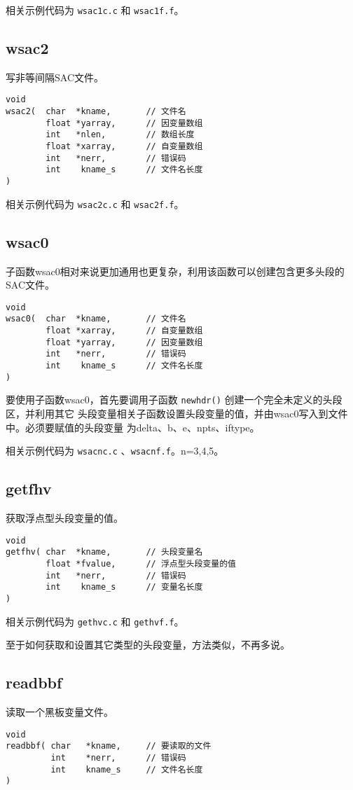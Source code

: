 相关示例代码为 \texttt{wsac1c.c} 和 \texttt{wsac1f.f}。

\subsection{wsac2}
写非等间隔SAC文件。

\begin{verbatim}
void
wsac2(  char  *kname,       // 文件名
        float *yarray,      // 因变量数组
        int   *nlen,        // 数组长度
        float *xarray,      // 自变量数组
        int   *nerr,        // 错误码
        int    kname_s      // 文件名长度
)
\end{verbatim}

相关示例代码为 \texttt{wsac2c.c} 和 \texttt{wsac2f.f}。

\subsection{wsac0}
子函数wsac0相对来说更加通用也更复杂，利用该函数可以创建包含更多头段的SAC文件。

\begin{verbatim}
void
wsac0(  char  *kname,       // 文件名
        float *xarray,      // 自变量数组
        float *yarray,      // 因变量数组
        int   *nerr,        // 错误码
        int    kname_s      // 文件名长度
)
\end{verbatim}

要使用子函数wsac0，首先要调用子函数 \texttt{newhdr()} 创建一个完全未定义的头段区，并利用其它
头段变量相关子函数设置头段变量的值，并由wsac0写入到文件中。必须要赋值的头段变量
为delta、b、e、npts、iftype。

相关示例代码为 \texttt{wsacnc.c} 、\texttt{wsacnf.f}。n=3,4,5。

\subsection{getfhv}
获取浮点型头段变量的值。
\begin{verbatim}
void
getfhv( char  *kname,       // 头段变量名
        float *fvalue,      // 浮点型头段变量的值
        int   *nerr,        // 错误码
        int    kname_s      // 变量名长度
)
\end{verbatim}

相关示例代码为 \texttt{gethvc.c} 和 \texttt{gethvf.f}。

至于如何获取和设置其它类型的头段变量，方法类似，不再多说。

\subsection{readbbf}
读取一个黑板变量文件。
\begin{verbatim}
void
readbbf( char   *kname,     // 要读取的文件
         int    *nerr,      // 错误码
         int    kname_s     // 文件名长度
)
\end{verbatim}

